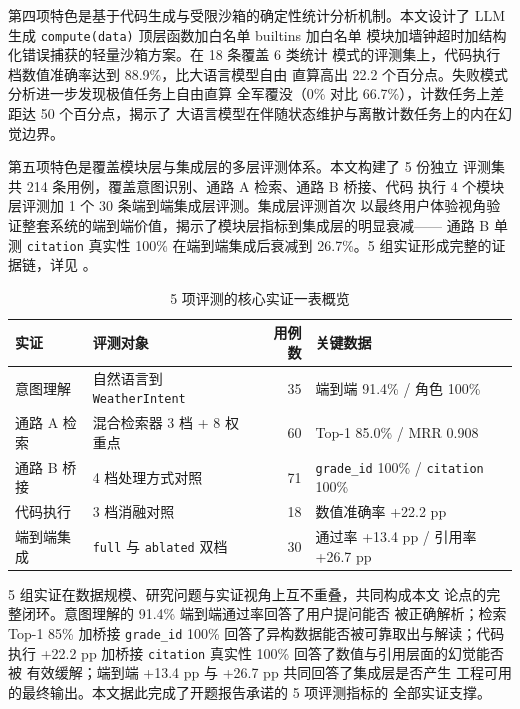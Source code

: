 第四项特色是基于代码生成与受限沙箱的确定性统计分析机制。本文设计了
LLM 生成 \texttt{compute(data)} 顶层函数加白名单 builtins 加白名单
模块加墙钟超时加结构化错误捕获的轻量沙箱方案。在 18 条覆盖 6 类统计
模式的评测集上，代码执行档数值准确率达到 88.9\%，比大语言模型自由
直算高出 22.2 个百分点。失败模式分析进一步发现极值任务上自由直算
全军覆没（0\% 对比 66.7\%），计数任务上差距达 50 个百分点，揭示了
大语言模型在伴随状态维护与离散计数任务上的内在幻觉边界。

第五项特色是覆盖模块层与集成层的多层评测体系。本文构建了 5 份独立
评测集共 214 条用例，覆盖意图识别、通路 A 检索、通路 B 桥接、代码
执行 4 个模块层评测加 1 个 30 条端到端集成层评测。集成层评测首次
以最终用户体验视角验证整套系统的端到端价值，揭示了模块层指标到集成层的明显衰减——
通路 B 单测 \texttt{citation} 真实性 100\% 在端到端集成后衰减到
26.7\%。5 组实证形成完整的证据链，详见 。

\begin{table}[H]
    \centering
    \caption{5 项评测的核心实证一表概览}
    \label{tab:evidence-summary}
    \song\fontsize{9pt}{12pt}\selectfont
    \renewcommand{\arraystretch}{0.95}
    \begin{tabular}{llrl}
        \toprule
        实证 & 评测对象 & 用例数 & 关键数据 \\
        \midrule
        意图理解 & 自然语言到 \texttt{WeatherIntent} & 35 & 端到端 91.4\% / 角色 100\% \\
        通路 A 检索 & 混合检索器 3 档 + 8 权重点 & 60 & Top-1 85.0\% / MRR 0.908 \\
        通路 B 桥接 & 4 档处理方式对照 & 71 & \texttt{grade\_\bk{}id} 100\% / \texttt{citation} 100\% \\
        代码执行 & 3 档消融对照 & 18 & 数值准确率 +22.2 pp \\
        端到端集成 & \texttt{full} 与 \texttt{ablated} 双档 & 30 & 通过率 +13.4 pp / 引用率 +26.7 pp \\
        \bottomrule
    \end{tabular}
\end{table}

5 组实证在数据规模、研究问题与实证视角上互不重叠，共同构成本文
论点的完整闭环。意图理解的 91.4\% 端到端通过率回答了用户提问能否
被正确解析；检索 Top-1 85\% 加桥接 \texttt{grade\_\bk{}id} 100\%
回答了异构数据能否被可靠取出与解读；代码执行 +22.2 pp 加桥接
\texttt{citation} 真实性 100\% 回答了数值与引用层面的幻觉能否被
有效缓解；端到端 +13.4 pp 与 +26.7 pp 共同回答了集成层是否产生
工程可用的最终输出。本文据此完成了开题报告承诺的 5 项评测指标的
全部实证支撑。
